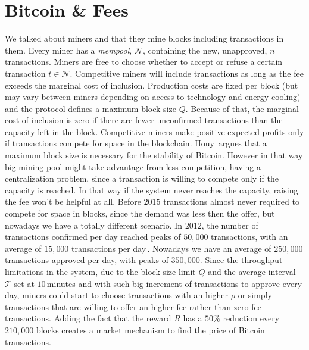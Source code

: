 \documentclass[USenglish]{uit-thesis}
\begin{document}
\section{Bitcoin \& Fees}
\label{sec:bitcoinfee}
We talked about miners and that they mine blocks including
transactions in them. Every miner has a \emph{mempool}, $\mathcal{N}$,
containing the new, unapproved, $n$ transactions.
Miners are free to choose
whether to accept or refuse a certain transaction $t \in \mathcal{N}$.
Competitive miners will include transactions as long as the fee exceeds
the marginal cost of inclusion. Production costs are fixed
per block (but may vary between miners depending on access to
technology and energy cooling) and the protocol
defines a maximum block size $Q$.
Because of that, the marginal cost of inclusion is zero if there are
fewer unconfirmed transactions than the capacity left in the block.
Competitive miners make positive expected profits only if transactions
compete for space in the blockchain. Houy\,\cite{houy2014EOBTF}
argues that a maximum block size is necessary for the stability of Bitcoin.
However in that way big mining pool might take advantage from less competition,
having a centralization problem, since a transaction is willing to
compete only if the capacity is reached.
In that way if the system never reaches the capacity, raising the fee
won't be helpful at all. Before $2015$ transactions almost
never required to compete for space in blocks, since the demand
was less then the offer, but nowadays we have a totally different
scenario. 
In $2012$, the number of transactions confirmed per day
reached peaks of $50,000$ transactions, with an average of
$15,000$ transactions per day\,\cite{bitcoin_blockchain}.
Nowadays we have an average of $250,000$ transactions
approved per day, with peaks of $350,000$. Since the throughput
limitations in the system, due to the block size limit $Q$
and the average interval $\mathcal{T}$ set at $10$\,minutes and
with such big increment of transactions to approve every day,
miners could start to choose transactions with an higher
$\rho$ or simply transactions that are willing to offer an higher fee
rather than zero-fee transactions.
Adding the fact that the reward $R$ has a $50\%$ reduction every
$210,000$ blocks creates a market mechanism to find the price
of Bitcoin transactions.
\end{document}
